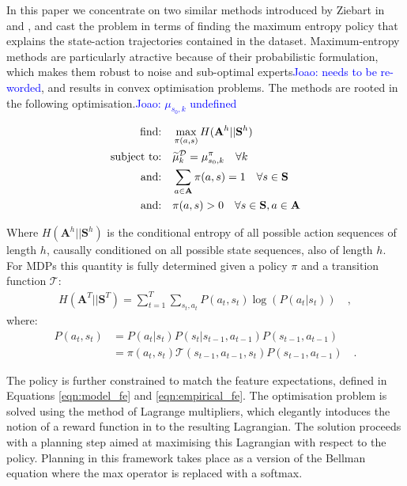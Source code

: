 \documentclass[letterpaper]{article}
\newcommand{\jm}[1]{\textcolor{blue}{Joao: #1}}
\newcommand{\jm}[1]{}
\begin{document}
In this paper we concentrate on two similar methods introduced by Ziebart in \cite{ziebart2008maximum} and \cite{ziebart2010modelingthesis}, and cast the problem in terms of finding the maximum entropy policy that explains the state-action trajectories contained in the dataset. Maximum-entropy methods are particularly atractive because of their probabilistic formulation, which makes them robust to noise and sub-optimal experts\jm{needs to be re-worded}, and results in convex optimisation problems. The methods are rooted in the following optimisation.\jm{$\mu_{s_0,k}$ undefined}

\begin{align}
	\hbox{find:}\quad &\max\limits_{\pi(a,s)} H(\mathbf{A}^h||\mathbf{S}^h)\\
\hbox{subject to:}\quad &\widetilde{\mu}^{\mathcal{D}}_k   = \mu^{\pi}_{s_0,k} \quad \forall k \label{eq:good_ineq}\\
\hbox{and:}\quad &\sum_{a\in\mathbf{A}}\pi(a,s)  = 1 \quad \forall s\in\mathbf{S}\\
\hbox{and:}\quad &\pi(a,s)  > 0 \quad \forall s\in\mathbf{S},a\in\mathbf{A}  
\end{align}

Where $H(\mathbf{A}^h||\mathbf{S}^h)$ is the conditional entropy of all possible action sequences of length $h$, causally conditioned on all possible state sequences, also of length $h$. For MDPs this quantity is fully determined given a policy $\pi$ and a transition function $\mathcal{T}$:
\begin{align}
H(\mathbf{A}^T||\mathbf{S}^T) = \sum_{t=1}^T \sum_{s_t,a_t} P(a_t,s_t)\log(P(a_t|s_t))\quad,
\label{eg:entdef}
\end{align}
where:
\begin{align*}
  P(a_t,s_t)&= P(a_t|s_t)P(s_t|s_{t-1},a_{t-1})P(s_{t-1},a_{t-1})\\
  &=\pi(a_t,s_t)\mathcal T(s_{t-1},a_{t-1},s_t)P(s_{t-1},a_{t-1})\quad.
\end{align*}
	
 The policy is further constrained to match the feature expectations, defined in Equations \eqref{eqn:model_fe} and \eqref{eqn:empirical_fe}. The optimisation problem is solved using the method of Lagrange multipliers, which elegantly intoduces the notion of a reward function in to the resulting Lagrangian. The solution proceeds with a planning step aimed at maximising this Lagrangian with respect to the policy. Planning in this framework takes place as a version of the Bellman equation \cite{sutton1998reinforcement} where the max operator is replaced with a softmax.
\end{document}

